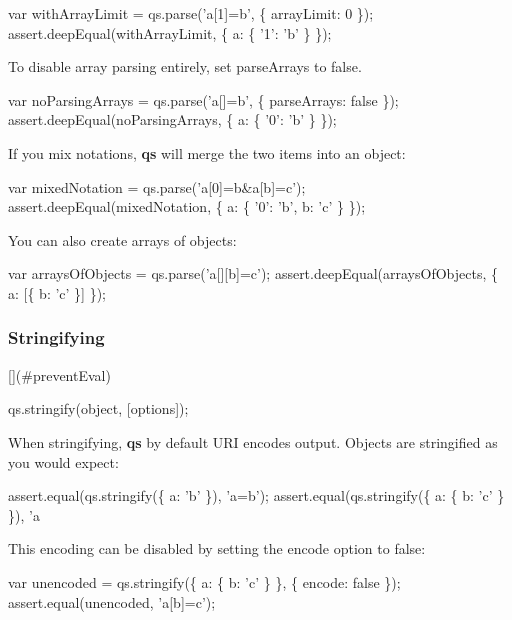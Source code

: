 \begin{DoxyCode}
var withArrayLimit = qs.parse('a[1]=b', \{ arrayLimit: 0 \});
assert.deepEqual(withArrayLimit, \{ a: \{ '1': 'b' \} \});
\end{DoxyCode}


To disable array parsing entirely, set {\ttfamily parse\+Arrays} to {\ttfamily false}.


\begin{DoxyCode}
var noParsingArrays = qs.parse('a[]=b', \{ parseArrays: false \});
assert.deepEqual(noParsingArrays, \{ a: \{ '0': 'b' \} \});
\end{DoxyCode}


If you mix notations, {\bfseries qs} will merge the two items into an object\+:


\begin{DoxyCode}
var mixedNotation = qs.parse('a[0]=b&a[b]=c');
assert.deepEqual(mixedNotation, \{ a: \{ '0': 'b', b: 'c' \} \});
\end{DoxyCode}


You can also create arrays of objects\+:


\begin{DoxyCode}
var arraysOfObjects = qs.parse('a[][b]=c');
assert.deepEqual(arraysOfObjects, \{ a: [\{ b: 'c' \}] \});
\end{DoxyCode}


\subsubsection*{Stringifying}

\mbox{[}\mbox{]}(\#prevent\+Eval) 
\begin{DoxyCode}
qs.stringify(object, [options]);
\end{DoxyCode}


When stringifying, {\bfseries qs} by default U\+RI encodes output. Objects are stringified as you would expect\+:


\begin{DoxyCode}
assert.equal(qs.stringify(\{ a: 'b' \}), 'a=b');
assert.equal(qs.stringify(\{ a: \{ b: 'c' \} \}), 'a%
\end{DoxyCode}


This encoding can be disabled by setting the {\ttfamily encode} option to {\ttfamily false}\+:


\begin{DoxyCode}
var unencoded = qs.stringify(\{ a: \{ b: 'c' \} \}, \{ encode: false \});
assert.equal(unencoded, 'a[b]=c');
\end{DoxyCode}


